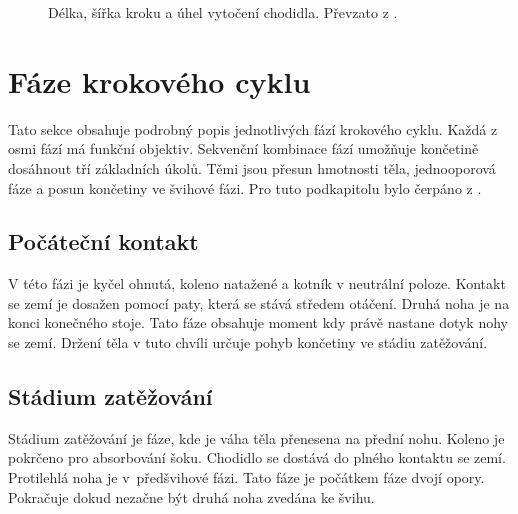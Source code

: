 \begin{figure}[h]
\begin{center}
\caption{Délka, šířka kroku a úhel vytočení chodidla. Převzato z \cite{gait_review}.} \label{step_length}
\end{center}
\end{figure}

\section{Fáze krokového cyklu}
Tato sekce obsahuje podrobný popis jednotlivých fází krokového cyklu. Každá z osmi fází má funkční objektiv. Sekvenční kombinace fází umožňuje končetině dosáhnout tří základních úkolů. Těmi jsou přesun hmotnosti těla, jednooporová fáze a posun končetiny ve švihové fázi. Pro tuto podkapitolu bylo čerpáno z \cite{gait_review}. 
\subsection{Počáteční kontakt}
V této fázi je kyčel ohnutá, koleno natažené a kotník v neutrální poloze. Kontakt se zemí je dosažen pomocí paty, která se stává středem otáčení. Druhá noha je na konci konečného stoje. Tato fáze obsahuje moment kdy právě nastane dotyk nohy se zemí. Držení těla v tuto chvíli určuje pohyb končetiny ve stádiu zatěžování. 
\subsection{Stádium zatěžování}
Stádium zatěžování je fáze, kde je váha těla přenesena na přední nohu. Koleno je pokrčeno pro absorbování šoku. Chodidlo se dostává do plného kontaktu se zemí. Protilehlá noha je v~předšvihové fázi. Tato fáze je počátkem fáze dvojí opory. Pokračuje dokud nezačne být druhá noha zvedána ke švihu. 
